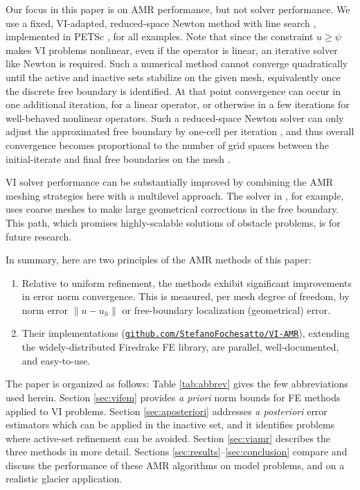 \documentclass[]{interact}
\theoremstyle{plain}%
\theoremstyle{definition}
\theoremstyle{remark}
\begin{document}
Our focus in this paper is on AMR performance, but not solver performance.  We use a fixed, VI-adapted, reduced-space Newton method with line search \cite{BensonMunson2006}, implemented in PETSc \cite{petsc-user-ref}, for all examples.  Note that since the constraint $u \geq \psi$ makes VI problems nonlinear, even if the operator is linear, an iterative solver like Newton is required.  Such a numerical method cannot converge quadratically until the active and inactive sets stabilize on the given mesh, equivalently once the discrete free boundary is identified.  At that point convergence can occur in one additional iteration, for a linear operator, or otherwise in a few iterations for well-behaved nonlinear operators.  Such a reduced-space Newton solver can only adjust the approximated free boundary by one-cell per iteration \citep{GraeserKornhuber2009}, and thus overall convergence becomes proportional to the number of grid spaces between the initial-iterate and final free boundaries on the mesh \citep{Bueler2021}.

VI solver performance can be substantially improved by combining the AMR meshing strategies here with a multilevel approach.  The solver in \cite{BuelerFarrell2024}, for example, uses coarse meshes to make large geometrical corrections in the free boundary.  This path, which promises highly-scalable solutions of obstacle problems, is for future research.

In summary, here are two principles of the AMR methods of this paper:
\renewcommand{\labelenumi}{\arabic{enumi}.}
\begin{enumerate}
\item Relative to uniform refinement, the methods exhibit significant improvements in error norm convergence.  This is measured, per mesh degree of freedom, by norm error $\|u-u_h\|$ or free-boundary localization (geometrical) error.
\item Their implementations (\href{https://github.com/StefanoFochesatto/VI-AMR}{\texttt{github.com/StefanoFochesatto/VI-AMR}}), extending the widely-distributed Firedrake \cite{Langeetal2016} FE library, are parallel, well-documented, and easy-to-use.
\end{enumerate}

The paper is organized as follows:  Table \ref{tab:abbrev} gives the few abbreviations used herein.  Section \ref{sec:vifem} provides \emph{a priori} norm bounds for FE methods applied to VI problems.  Section \ref{sec:aposteriori} addresses \emph{a posteriori} error estimators which can be applied in the inactive set, and it identifies problems where active-set refinement can be avoided.  Section \ref{sec:viamr} describes the three methods in more detail.  Sections \ref{sec:results}--\ref{sec:conclusion} compare and discuss the performance of these AMR algorithms on model problems, and on a realistic glacier application.
\end{document}
